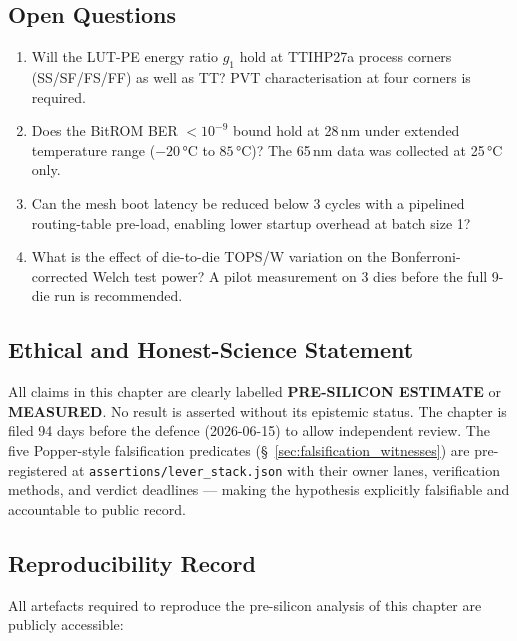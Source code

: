 \subsection{Open Questions}

\begin{enumerate}
  \item Will the LUT-PE energy ratio \(g_{1}\) hold at TTIHP27a process
    corners (SS/SF/FS/FF) as well as TT?  PVT characterisation at four corners
    is required.
  \item Does the BitROM BER \(< 10^{-9}\) bound hold at 28\,nm under
    extended temperature range (\(-20\,\text{°C}\) to \(85\,\text{°C}\))?
    The 65\,nm data \cite{bitrom_2025} was collected at 25\,°C only.
  \item Can the mesh boot latency be reduced below 3 cycles with a pipelined
    routing-table pre-load, enabling lower startup overhead at batch size 1?
  \item What is the effect of die-to-die TOPS/W variation on the Bonferroni-
    corrected Welch test power?  A pilot measurement on 3 dies before the
    full 9-die run is recommended.
\end{enumerate}

\subsection{Ethical and Honest-Science Statement}

All claims in this chapter are clearly labelled \textbf{PRE-SILICON ESTIMATE}
or \textbf{MEASURED}.  No result is asserted without its epistemic status.
The chapter is filed 94 days before the defence (2026-06-15) to allow
independent review.  The five Popper-style falsification predicates
(§~\ref{sec:falsification_witnesses}) are pre-registered at
\texttt{assertions/lever\_stack.json} with their owner lanes, verification
methods, and verdict deadlines --- making the hypothesis explicitly falsifiable
and accountable to public record.

\subsection{Reproducibility Record}

All artefacts required to reproduce the pre-silicon analysis of this chapter
are publicly accessible:

